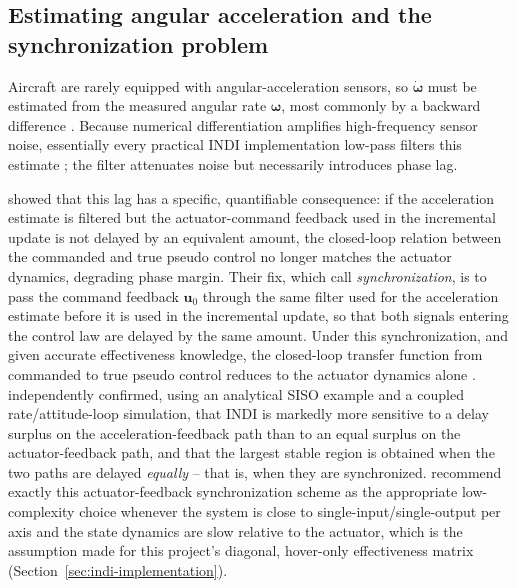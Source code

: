 \documentclass{article}
\begin{document}
\subsection{Estimating angular acceleration and the synchronization problem}
\label{sec:synchronization-theory}
Aircraft are rarely equipped with angular-acceleration sensors, so $\dot{\boldsymbol{\omega}}$ must be estimated from the measured angular rate $\boldsymbol{\omega}$, most commonly by a backward difference \citep{steinertPart2_2025}. Because numerical differentiation amplifies high-frequency sensor noise, essentially every practical INDI implementation low-pass filters this estimate \citep{steinertPart2_2025}; the filter attenuates noise but necessarily introduces phase lag.

\citet{smeur2015} showed that this lag has a specific, quantifiable consequence: if the acceleration estimate is filtered but the actuator-command feedback used in the incremental update is not delayed by an equivalent amount, the closed-loop relation between the commanded and true pseudo control no longer matches the actuator dynamics, degrading phase margin. Their fix, which \citet{steinertPart2_2025} call \emph{synchronization}, is to pass the command feedback $\mathbf{u}_0$ through the same filter used for the acceleration estimate before it is used in the incremental update, so that both signals entering the control law are delayed by the same amount. Under this synchronization, and given accurate effectiveness knowledge, the closed-loop transfer function from commanded to true pseudo control reduces to the actuator dynamics alone \citep{steinertPart2_2025}. \citet{vantveld2018} independently confirmed, using an analytical SISO example and a coupled rate/attitude-loop simulation, that INDI is markedly more sensitive to a delay surplus on the acceleration-feedback path than to an equal surplus on the actuator-feedback path, and that the largest stable region is obtained when the two paths are delayed \emph{equally} -- that is, when they are synchronized. \citet{steinertPart2_2025} recommend exactly this actuator-feedback synchronization scheme as the appropriate low-complexity choice whenever the system is close to single-input/single-output per axis and the state dynamics are slow relative to the actuator, which is the assumption made for this project's diagonal, hover-only effectiveness matrix (Section~\ref{sec:indi-implementation}).
\end{document}
